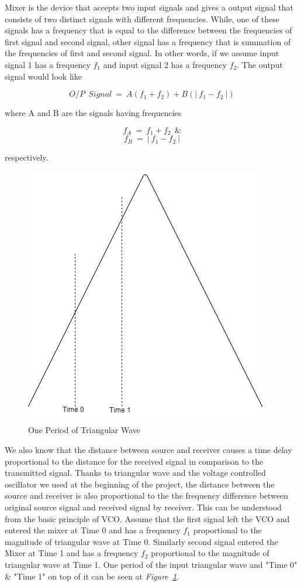 \documentclass[paper]{IEEEtran}
\begin{document}
	Mixer is the device that accepts two input signals and gives a output signal that consists of two distinct signals with different frequencies. While, one of these signals has a frequency that is equal to the difference between the frequencies of first signal and second signal, other signal has a frequency that is summation of the frequencies of first and second signal. In other words, if we assume input signal 1 has a frequency $f_1$ and input signal 2 has a frequency $f_2$. The output signal would look like  
	
	$$ O/P~~ Signal ~=~ A(f_1+f_2) + B(|~f_1 -f_2~|)  $$
	
	where A and B are the signals having frequencies  
	
	$$	f_A ~= ~ f_1+f_2~~ \&$$
	$$	f_B~=~|~f_1 -f_2~| $$ 
	
	respectively. 
	
	
\begin{figure}[h!]
\setlength{\unitlength}{\textwidth}
\center 
\includegraphics[width=0.25\unitlength]{triangular.png}
\caption{\label{fig:trimix}One Period of Triangular Wave }
\end{figure}		
	
	We also know that the distance between source and receiver causes a time delay proportional to the distance for the received signal in comparison to the transmitted signal. Thanks to triangular wave and the voltage controlled oscillator we used at the beginning of the project, the distance between the source and receiver is also proportional to the the frequency difference between original source signal and received signal by receiver. This can be understood from the basic principle of VCO. Assume that the first signal left the VCO and entered the mixer at Time 0 and has a frequency $f_1$ proportional to the magnitude of triangular wave at Time 0. Similarly second signal entered the Mixer at Time 1 and has a frequency $f_2$ proportional to the magnitude of triangular wave at Time 1. One period of the input triangular wave and "Time 0" \& "Time 1" on top of it can be seen at \textit{Figure~\ref{fig:trimix}}. 
	
\end{document}
